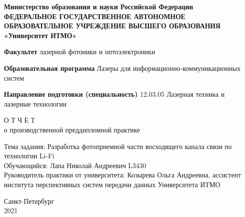 \begin{center}
    \hfill \break
    \footnotesize{\textbf{Министерство образования и науки Российской Федерации}} \\
    \scriptsize{\textbf{ФЕДЕРАЛЬНОЕ ГОСУДАРСТВЕННОЕ АВТОНОМНОЕ ОБРАЗОВАТЕЛЬНОЕ УЧРЕЖДЕНИЕ ВЫСШЕГО ОБРАЗОВАНИЯ}} \\
    \normalsize{\textbf{«Университет ИТМО»}} \\
\end{center}

\noindent\textbf{Факультет} лазерной фотоники и оптоэлектроники

\noindent\textbf{Образовательная программа} Лазеры для информационно-коммуникационных систем

\noindent\textbf{Направление подготовки (специальность)} 12.03.05 Лазерная техника и лазерные технологии\hfill\break

\begin{center}
    \Large{О Т Ч Е Т} \\
    \normalsize{о производственной преддипломной практике}
\end{center}


\hfill\break

\noindent
Тема задания: Разработка фотоприемной части восходящего канала связи по технологии Li-Fi \\

\noindent
Обучающийся: Лапа Николай Андреевич L3430 \\

\noindent
Руководитель практики от университета: Козырева Ольга Андреевна, ассистент института перспективных систем передачи данных Университета ИТМО \\

\hfill \break
\hfill \break
\hfill\break
\hfill\break
\hfill\break
\begin{center}
    Санкт-Петербург \\
    2021
\end{center}
\thispagestyle{empty}